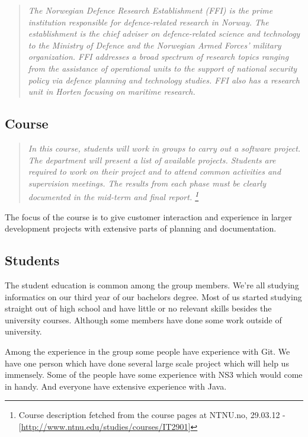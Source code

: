     \begin{quotation}
    \em The Norwegian Defence Research Establishment (FFI) is the prime institution responsible for defence-related research in Norway. The establishment is the chief adviser on defence-related science and technology to the Ministry of Defence and the Norwegian Armed Forces’ military organization. FFI addresses a broad spectrum of research topics ranging from the assistance of operational units to the support of national security policy via defence planning and technology studies. FFI also has a research unit in Horten focusing on maritime research.
    \end{quotation}
    
    \subsection{Course}\label{Course}
    \begin{quotation}
    \em In this course, students will work in groups to carry out a software project. The department will present a list of available projects. Students are required to work on their project and to attend common activities and supervision meetings. The results from each phase must be clearly documented in the mid-term and final report.
    \footnote{Course description fetched from the course pages at NTNU.no, 29.03.12 - [\url{http://www.ntnu.edu/studies/courses/IT2901}]}
    \end{quotation}
    
    The focus of the course is to give customer interaction and experience in larger development projects with extensive parts of planning and documentation. 
    
    
    \subsection{Students}\label{Students}
    The student education is common among the group members. We're all studying informatics on our third year of our bachelors degree. Most of us started studying straight out of high school and have little or no relevant skills besides the university courses. Although some members have done some work outside of university. 
    
    Among the experience in the group some people have experience with Git. We have one person which have done several large scale project which will help us immensely. Some of the people have some experience with NS3 which would come in handy. And everyone have extensive experience with Java.
    
